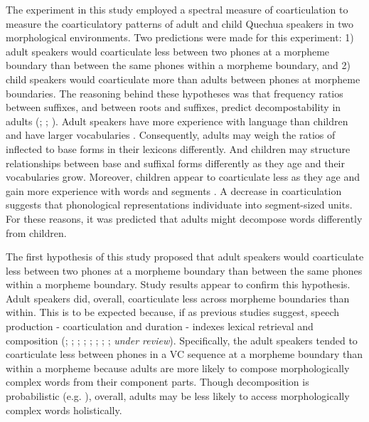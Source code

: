 \documentclass[a4paper,man,floatsintext,natbib,donotrepeattitle, apacite]{apa6}
\begin{document}
The experiment in this study employed a spectral measure of coarticulation to measure the coarticulatory patterns of adult and child Quechua speakers in two morphological environments. Two predictions were made for this experiment: 1) adult speakers would coarticulate less between two phones at a morpheme boundary than between the same phones within a morpheme boundary, and 2) child speakers would coarticulate more than adults between phones at morpheme boundaries. The reasoning behind these hypotheses was that  frequency ratios between suffixes, and between roots and suffixes, predict decompostability in adults (\citealt{hayCausesConsequencesWord2003}; \citealt{kempsProsodicCuesMorphological2005}; \citealt{ingoplagSuffixOrderingMorphological2009}). Adult speakers have more experience with language than children and have larger vocabularies \citep{lorgeEstimatingSizeVocabularies1963}. Consequently, adults may weigh the ratios of inflected to base forms in their lexicons differently. And children may structure relationships between base and suffixal forms differently as they age and their vocabularies grow. Moreover, children appear to coarticulate less as they age and gain more experience with words and segments \citep{noiraySpokenLanguageDevelopment2019}. A decrease in coarticulation suggests that phonological representations individuate into segment-sized units. For these reasons, it was predicted that adults might decompose words differently from children.

The first hypothesis of this study proposed that adult speakers would coarticulate less between two phones at a morpheme boundary than between the same phones within a morpheme boundary. Study results appear to confirm this hypothesis. Adult speakers did, overall, coarticulate less across morpheme boundaries than within. This is to be expected because, if as previous studies suggest, speech production - coarticulation and duration - indexes lexical retrieval and composition (\citealt{choEffectsMorphemeBoundaries2001}; \citealt{kempsProsodicCuesMorphological2005}; \citealt{lee-kimMorphologicalEffectsDarkness2013}; \citealt{plagHomophonyMorphologyAcoustics2017}; \citealt{pluymaekersMorphologicalEffectsFine2010}; \citealt{songEffectsCoarticulationMorphological2013}; \citeyear{songDurationalCuesFricative2013}; \citealt{sugaharaDurationalCorrelatesEnglish2009}; \citeauthor{tomaschekHowAnticipatoryCoarticulation2019} \textit{under review}). Specifically, the adult speakers tended to coarticulate less between phones in a VC sequence at a morpheme boundary than within a morpheme because adults are more likely to compose morphologically complex words from their component parts. Though decomposition is probabilistic (e.g. \citealt{hayCausesConsequencesWord2003}), overall, adults may be less likely to access morphologically complex words holistically. 
\end{document}

